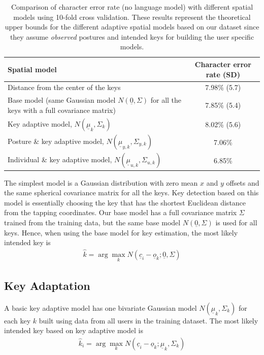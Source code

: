 \documentclass{sigchi}
\newcommand\tabhead[1]{\small\textbf{#1}}
\begin{document}
\begin{table} [tb]
  \centering
  \begin{tabular}{|l|c|}
    \hline
    \tabhead{Spatial model} &
    \multicolumn{1}{|p{0.2\columnwidth}|}{\centering\tabhead{Character
    error rate (SD)}} \\
    \hline
    Distance from the center of the keys & 7.98\% (5.7) \\
    \hline
    \multicolumn{1}{|p{0.7\columnwidth}|}{Base model (same Gaussian model $N(\underline 0, \Sigma)$ for
    all the keys with a full covariance matrix)} & 7.85\% (5.4) \\
    \hline
    \multicolumn{1}{|p{0.7\columnwidth}|}{Key adaptive model, $N(\underline
    \mu_k, \Sigma_k)$} & 8.02\% (5.6) \\
    \hline
    \multicolumn{1}{|p{0.7\columnwidth}|}{Posture \& key adaptive model, $N(\underline \mu_{y,k}, \Sigma_{y,k})$} & 7.06\% \\
    \hline
     \multicolumn{1}{|p{0.7\columnwidth}|}{Individual \& key adaptive model, $N(\underline \mu_{u,k}, \Sigma_{u,k})$} & 6.85\% \\
    \hline
  \end{tabular}
  \caption{Comparison of character error rate (no language model) with
  different spatial models using 10-fold cross validation. These results represent the theoretical upper bounds for the different adaptive spatial models based on our dataset since they assume \textit{observed} postures and intended keys for building the user specific models.}
  \label{tab:comparison}
\end{table}

The simplest model is a Gaussian distribution with zero mean $x$ and $y$
 offsets and the same spherical covariance matrix for all the keys. Key
detection based on this model is essentially choosing the key that has the shortest Euclidean distance from the tapping coordinates. 
Our base model has a full covariance matrix $\Sigma$ trained from the
training data, but the same base model $N(\underline 0, \Sigma)$ is used for all keys. Hence, when using the base model for key estimation, the most likely intended key is
\begin{align}          
\hat k = \arg\max_k N(\underline c_i - \underline o_k; \underline 0, \Sigma)
\end{align}


\subsection{Key Adaptation}
A basic key adaptive model has one bivariate Gaussian model
$N(\underline\mu_k, \Sigma_k)$ for each key $k$ built  using data from all users in the training dataset. The most likely intended key based on key adaptive model is
\begin{align}          
\hat k_i = \arg\max_k N(\underline c_i - \underline o_k; \underline \mu_k, \Sigma_k)
\end{align}
\end{document}
